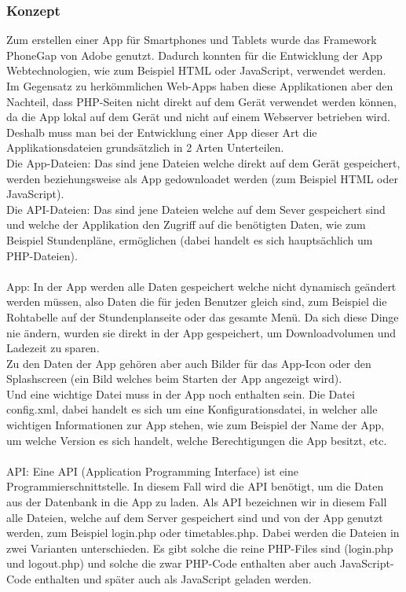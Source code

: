 \subsubsection{Konzept}
Zum erstellen einer App für Smartphones und Tablets wurde das Framework PhoneGap von Adobe genutzt. Dadurch konnten für die Entwicklung der App Webtechnologien, wie zum Beispiel HTML oder JavaScript, verwendet werden. Im Gegensatz zu herkömmlichen Web-Apps haben diese Applikationen aber den Nachteil, dass PHP-Seiten nicht direkt auf dem Gerät verwendet werden können, da die App lokal auf dem Gerät und nicht auf einem Webserver betrieben wird.
Deshalb muss man bei der Entwicklung einer App dieser Art die Applikationsdateien grundsätzlich in 2 Arten Unterteilen.\\
Die App-Dateien: Das sind jene Dateien welche direkt auf dem Gerät gespeichert, werden beziehungsweise als App gedownloadet werden (zum Beispiel HTML oder JavaScript).\\
Die API-Dateien: Das sind jene Dateien welche auf dem Sever gespeichert sind und welche der Applikation den Zugriff auf die benötigten Daten, wie zum Beispiel Stundenpläne, ermöglichen (dabei handelt es sich hauptsächlich um PHP-Dateien).\\
\\
App:	In der App werden alle Daten gespeichert welche nicht dynamisch geändert werden müssen, also Daten die für jeden Benutzer gleich sind, zum Beispiel die Rohtabelle auf der Stundenplanseite oder das gesamte Menü. Da sich diese Dinge nie ändern, wurden sie direkt in der App gespeichert, um Downloadvolumen und Ladezeit zu sparen.\\
Zu den Daten der App gehören aber auch Bilder für das App-Icon oder den Splashscreen (ein Bild welches beim Starten der App angezeigt wird).\\
Und eine wichtige Datei muss in der App noch enthalten sein. Die Datei config.xml, dabei handelt es sich um eine Konfigurationsdatei, in welcher alle wichtigen Informationen zur App stehen, wie zum Beispiel der Name der App, um welche Version es sich handelt, welche Berechtigungen die App besitzt, etc.\\
\\
API:	Eine API (Application Programming Interface) ist eine Programmierschnittstelle. In diesem Fall wird die API benötigt, um die Daten aus der Datenbank in die App zu laden. Als API bezeichnen wir in diesem Fall alle Dateien, welche auf dem Server gespeichert sind und von der App genutzt werden, zum Beispiel login.php oder timetables.php.
Dabei werden die Dateien in zwei Varianten unterschieden. Es gibt solche die reine PHP-Files sind (login.php und logout.php) und solche die zwar PHP-Code enthalten aber auch JavaScript-Code enthalten und später auch als JavaScript geladen werden.\\

